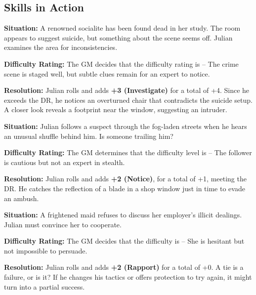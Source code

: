 \subsection{Skills in Action}


\begin{WyrdExample}
	\textbf{Situation:} A renowned socialite has been found dead in her study. The room appears to suggest suicide, but something about the scene seems off. Julian examines the area for inconsistencies.

	\noindent
	\textbf{Difficulty Rating:} The GM decides that the difficulty rating is \Formidable – The crime scene is staged well, but subtle clues remain for an expert to notice.

	\noindent
	\textbf{Resolution:} Julian rolls  and adds \textbf{+3 (Investigate)} for a total of +4. Since he exceeds the DR, he notices an overturned chair that contradicts the suicide setup. A closer look reveals a footprint near the window, suggesting an intruder.
\end{WyrdExample}


\begin{WyrdExample}
	\textbf{Situation:} Julian follows a suspect through the fog-laden streets when he hears an unusual shuffle behind him. Is someone trailing him?

	\noindent\textbf{Difficulty Rating:} The GM determines that the difficulty level is \Difficult – The follower is cautious but not an expert in stealth.

	\noindent\textbf{Resolution:} Julian rolls  and adds  \textbf{+2 (Notice)}, for a total of +1, meeting the DR. He catches the reflection of a blade in a shop window just in time to evade an ambush.
\end{WyrdExample}


\begin{WyrdExample}
	\textbf{Situation:} A frightened maid refuses to discuss her employer’s illicit dealings. Julian must convince her to cooperate.

	\noindent\textbf{Difficulty Rating:} The GM decides that the difficulty is \Challenging – She is hesitant but not impossible to persuade.

	\noindent\textbf{Resolution:} Julian rolls \FudgeRes{+---} and adds \textbf{+2 (Rapport)} for a total of +0. A tie is a failure, or is it? If he changes his tactics or offers protection to try again, it might turn into a partial success.
\end{WyrdExample}


